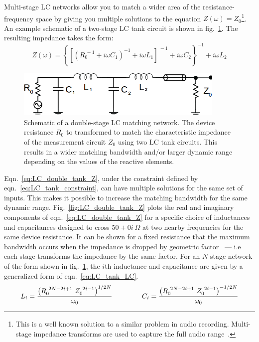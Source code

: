 Multi-stage LC networks allow you to match a wider area of the resistance-frequency space by giving you multiple solutions to the equation $Z(\omega)=Z_0$\footnote{This is a well known solution to a similar problem in audio recording. Multi-stage impedance transforms are used to capture the full audio range~\cite{?}.}. An example schematic of a two-stage LC tank circuit is shown in fig.~\ref{fig:schematic_double_matching}. The resulting impedance takes the form:
\begin{equation}\label{eq:LC_double_tank_Z}
Z(\omega) = \left\lbrace\left[\left(R_0^{~-1}+i\omega C_1\right)^{-1}+i\omega L_1\right]^{~-1}+i\omega C_2\right\rbrace^{-1}+i\omega L_2
\end{equation}
\begin{figure}
\centering
\includegraphics[width=100mm]{figures/Johnson_noise_thermometry/schematic_double_matching}
\caption{Schematic of a double-stage LC matching network. The device resistance $R_0$ to transformed to match the characteristic impedance of the measurement circuit $Z_0$ using two LC tank circuits. This results in a wider matching bandwidth and/or larger dynamic range depending on the values of the reactive elements.}
\label{fig:schematic_double_matching}
\end{figure}
Eqn.~\ref{eq:LC_double_tank_Z}, under the constraint defined by eqn.~\ref{eq:LC_tank_constraint}, can have multiple solutions for the same set of inputs. This makes it possible to increase the matching bandwidth for the same dynamic range. Fig.~\ref{fig:LC_double_tank_Z} plots the real and imaginary components of eqn.~\ref{eq:LC_double_tank_Z} for a specific choice of inductances and capacitances designed to cross $50+0i~\Omega$ at two nearby frequencies for the same device resistance. It can be shown for a fixed resistance that the maximum bandwidth occurs when the impedance is dropped by geometric factor~\cite{pozar_microwave_2011} --- i.e each stage transforms the impedance by the same factor. For an $N$ stage network of the form shown in fig.~\ref{fig:schematic_double_matching}, the $i$th inductance and capacitance are given by a generalized form of eqn.~\ref{eq:LC_tank_LC}. 
\begin{equation}\label{eq:LC_double_tank_LC}
L_i = \frac{\left(R_0^{~2N-2i+1}~Z_0^{~2i-1}\right)^{1/2N}}{\omega_0}
\hspace{15mm}
C_i = \frac{\left(R_0^{~2N-2i+1}~Z_0^{~2i-1}\right)^{-1/2N}}{\omega_0}
\end{equation}
